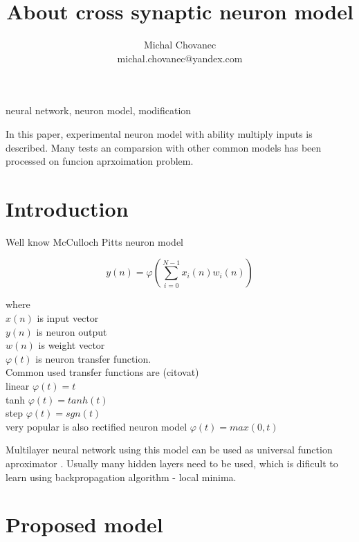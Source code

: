 \documentclass[10pt,a5paper]{article}
\begin{document}
\title{About cross synaptic neuron model}
\author{Michal Chovanec\\
michal.chovanec@yandex.com}
\date{}
\maketitle
\thispagestyle{empty}


 neural network, neuron model, modification

 In this paper, experimental neuron model with ability
multiply inputs is described. Many tests an comparsion with other common models
has been processed on funcion aprxoimation problem.

\section{Introduction}

Well know McCulloch Pitts neuron model

\begin{equation}
\label{eq:McCulloch_Pitts}
  y(n) = \varphi(\sum_{i = 0}^{N-1} x_i(n)w_i(n))
\end{equation}

where \\
$x(n)$ is input vector \\
$y(n)$ is neuron output \\
$w(n)$ is weight vector \\
$\varphi(t)$ is neuron transfer function. \\

Common used transfer functions are (citovat) \\
linear $\varphi(t) = t$ \\
tanh $\varphi(t) = tanh(t)$ \\
step $\varphi(t) = sgn(t)$ \\

very popular is also rectified neuron model $\varphi(t) = max(0, t)$

Multilayer neural network using this model can be used as universal function aproximator \cite{bib:Aproximation}. Usually
many hidden layers need to be used, which is dificult to learn using backpropagation
algorithm - local minima.

\section{Proposed model}
\end{document}
